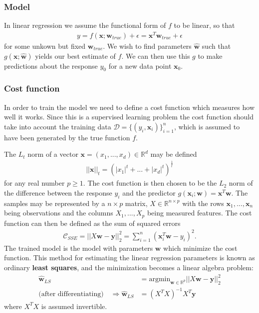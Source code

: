 \documentclass[twoside,english]{uiofysmaster}
\begin{document}
\subsubsection{Model}
In linear regression we assume the functional form of $f$ to be linear, so that
\begin{align}
	y = f(\bm{x}; \bm{w}_{true}) + \epsilon = \bm{x}^T \bm{w}_{true} + \epsilon
\end{align}
for some unkown but fixed $\bm{w}_{true}$. We wish to find parameters $\hat{\bm{w}}$ such that $g(\bm{x}; \hat{\bm{w}})$ yields our best estimate of $f$. We can then use this $g$ to make predictions about the response $y_0$ for a new data point $\bm{x}_0$. 

\subsubsection{Cost function}
In order to train the model we need to define a cost function which measures how well it works. Since this is a supervised learning problem the cost function should take into account the training data $\mathcal{D}= \{ (y_i, \bm{x}_i) \}_{i=1}^n$, which is assumed to have been generated by the true function $f$. 

The $L_t$ norm of a vector $\bm{x} = (x_1, ..., x_d) \in \mathbb{R}^d$ may be defined
\begin{align}
	||\bm{x} ||_t = (|x_1|^t +...+ |x_d|^t )^{\frac{1}{t}}
\end{align}
for any real number $p\geq 1$. The cost function is then chosen to be the $L_2$ norm of the difference between the response $y_i$ and the predictor $g(\bm{x}_i; \bm{w}) = \bm{x}^T \bm{w}$.
The samples may be represented by a $n\times p$ matrix, $X \in \mathbb{R}^{n\times p}$ with the rows
$\bm{x}_1, ..., \bm{x}_n$ being observations and the columns $X_1, ..., X_p$ being measured features. The cost function can then be defined as the sum of squared errors
\begin{align}
	 \mathcal{C}_{SSE} = ||X\mathbf{w} - \mathbf{y}||_2^2 =  \sum_{i=1}^n (\mathbf{x}_i^T \mathbf{w} - y_i)^2 .
\end{align}
The trained model is the model with parameters $\bm{w}$ which minimize the cost function. This method for estimating the linear regression parameters is known as ordinary \textbf{least squares}, and the minimization becomes a linear algebra problem:
\begin{align}
	\hat{\mathbf{w}}_{LS} &= \text{argmin}_{\mathbf{w} \in \mathbb{R}^p} ||X\mathbf{w} - \mathbf{y}||_2^2 \\
	\text{(after differentiating)} \quad \Rightarrow  \hat{\mathbf{w}}_{LS} &= (X^T X)^{-1} X^T \mathbf{y} 
\end{align}
where $X^T X$ is assumed invertible. 
\end{document}
